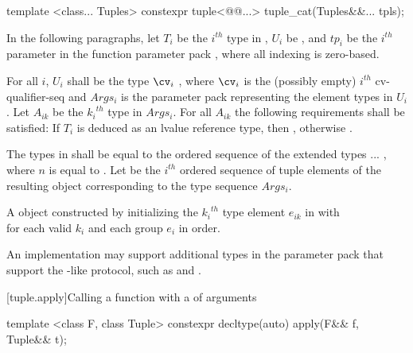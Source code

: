 \begin{itemdecl}
template <class... Tuples>
  constexpr tuple<@@...> tuple_cat(Tuples&&... tpls);
\end{itemdecl}

\begin{itemdescr}
\pnum
In the following paragraphs, let $T_i$ be the $i^{th}$ type in ,
$U_i$ be , and $tp_i$ be the $i^{th}$
parameter in the function parameter pack , where all indexing is
zero-based.

\pnum
\requires For all $i$, $U_i$ shall be the type
$\cv_i$ , where $\cv_i$ is the (possibly empty) $i^{th}$
cv-qualifier-seq and $Args_i$ is the parameter pack representing the element
types in $U_i$. Let ${A_{ik}}$ be the ${k_i}^{th}$ type in $Args_i$. For all
$A_{ik}$ the following requirements shall be satisfied: If $T_i$ is
deduced as an lvalue reference type, then
, otherwise
.

\pnum
\remarks The types in  shall be equal to the ordered
sequence of the extended types
 ... , where $n$ is
equal to . Let  be the $i^{th}$
ordered sequence of tuple elements of the resulting  object
corresponding to the type sequence $Args_i$.

\pnum
\returns A  object constructed by initializing the ${k_i}^{th}$
type element $e_{ik}$ in  with\\
 for each valid $k_i$ and
each group $e_i$ in order.

\pnum
\realnote An implementation may support additional types in the parameter
pack  that support the -like protocol, such as
 and .
\end{itemdescr}

[tuple.apply]{Calling a function with a  of arguments}

%
\begin{itemdecl}
template <class F, class Tuple>
  constexpr decltype(auto) apply(F&& f, Tuple&& t);
\end{itemdecl}

